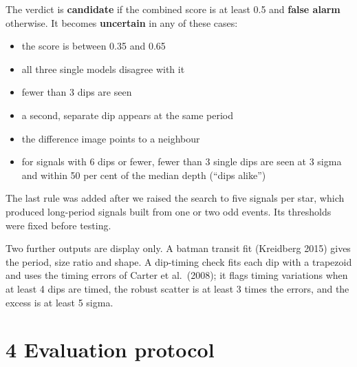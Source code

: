 \documentclass[
]{article}
\providecommand{\tightlist}{%
  \setlength{\itemsep}{0pt}\setlength{\parskip}{0pt}}
\begin{document}
The verdict is \textbf{candidate} if the combined score is at least 0.5
and \textbf{false alarm} otherwise. It becomes \textbf{uncertain} in any
of these cases:

\begin{itemize}
\tightlist
\item
  the score is between 0.35 and 0.65
\item
  all three single models disagree with it
\item
  fewer than 3 dips are seen
\item
  a second, separate dip appears at the same period
\item
  the difference image points to a neighbour
\item
  for signals with 6 dips or fewer, fewer than 3 single dips are seen at
  3 sigma and within 50 per cent of the median depth (``dips alike'')
\end{itemize}

The last rule was added after we raised the search to five signals per
star, which produced long-period signals built from one or two odd
events. Its thresholds were fixed before testing.

Two further outputs are display only. A batman transit fit (Kreidberg
2015) gives the period, size ratio and shape. A dip-timing check fits
each dip with a trapezoid and uses the timing errors of Carter et
al.~(2008); it flags timing variations when at least 4 dips are timed,
the robust scatter is at least 3 times the errors, and the excess is at
least 5 sigma.

\hypertarget{evaluation-protocol}{%
\section{4 Evaluation protocol}\label{evaluation-protocol}}
\end{document}
